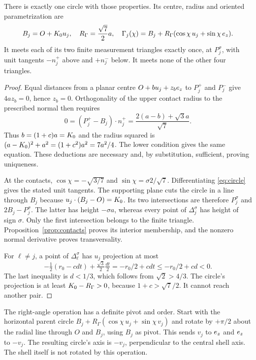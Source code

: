 \begin{theorem}\label{thm:circle}
There is exactly one circle with those properties. Its centre, radius and oriented parametrization are
\begin{equation}\label{eq:circle}
B_j=O+K_0 u_j,\quad R_\Gamma=\frac{\sqrt7}2a,\quad
\Gamma_j(\chi)=B_j+R_\Gamma(\cos\chi\,u_j+\sin\chi\,e_z).
\end{equation}
It meets each of its two finite measurement triangles exactly once, at $P_j^\sigma$, with unit tangents $-n_j^+$ above and $+n_j^-$ below. It meets none of the other four triangles.
\end{theorem}
\begin{proof}
Equal distances from a planar centre $O+b u_j+z_be_z$ to $P_j^+$ and $P_j^-$ give $4az_b=0$, hence $z_b=0$. Orthogonality of the upper contact radius to the prescribed normal then requires
\[
0=(P_j^+-B_j)\cdot n_j^+
=\frac{2(a-b)+\sqrt3a}{\sqrt7}.
\]
Thus $b=(1+c)a=K_0$ and the radius squared is $(a-K_0)^2+a^2=(1+c^2)a^2=7a^2/4$. The lower condition gives the same equation. These deductions are necessary and, by substitution, sufficient, proving uniqueness.

At the contacts, $\cos\chi=-\sqrt{3/7}$ and $\sin\chi=\sigma2/\sqrt7$. Differentiating \eqref{eq:circle} gives the stated unit tangents. The supporting plane cuts the circle in a line through $B_j$ because $u_j\cdot(B_j-O)=K_0$. Its two intersections are therefore $P_j^\sigma$ and $2B_j-P_j^\sigma$. The latter has height $-\sigma a$, whereas every point of $\Delta_j^\sigma$ has height of sign $\sigma$. Only the first intersection belongs to the finite triangle. Proposition~\ref{prop:contacts} proves its interior membership, and the nonzero normal derivative proves transversality.

For $\ell\ne j$, a point of $\Delta_\ell^\sigma$ has $u_j$ projection at most
\[
-\tfrac12(r_0-cdt)+\tfrac{\sqrt3}{2}\tfrac{dt}{2}
=-r_0/2+cdt\le-r_0/2+cd<0.
\]
The last inequality is $d<1/3$, which follows from $\sqrt2>4/3$. The circle's projection is at least $K_0-R_\Gamma>0$, because $1+c>\sqrt7/2$. It cannot reach another pair.
\end{proof}

The right-angle operation has a definite pivot and order. Start with the horizontal parent circle $B_j+R_\Gamma(\cos\chi\,u_j+\sin\chi\,v_j)$ and rotate by $+\pi/2$ about the radial line through $O$ and $B_j$, using $B_j$ as pivot. This sends $v_j$ to $e_z$ and $e_z$ to $-v_j$. The resulting circle's axis is $-v_j$, perpendicular to the central shell axis. The shell itself is not rotated by this operation.

